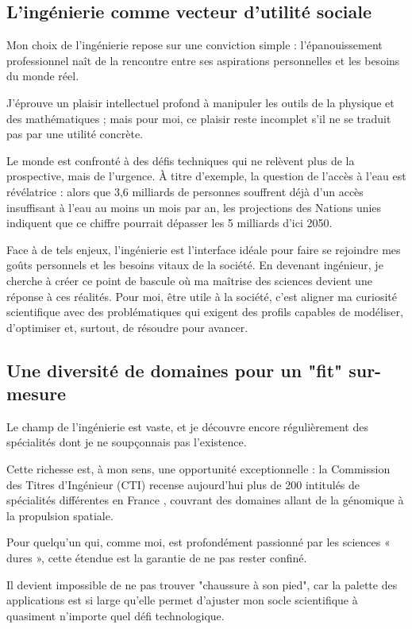 \subsection{L'ingénierie comme vecteur d'utilité sociale}
Mon choix de l'ingénierie repose sur une conviction simple : 
l'épanouissement professionnel naît de la rencontre 
entre ses aspirations personnelles et les besoins du monde réel. 

J’éprouve un plaisir intellectuel profond à manipuler les outils de la physique et des mathématiques ; 
mais pour moi, ce plaisir reste incomplet s'il ne se traduit pas par une utilité concrète.

Le monde est confronté à des défis techniques qui ne relèvent plus de la prospective, 
mais de l'urgence. 
À titre d'exemple, la question de l'accès à l'eau est révélatrice : 
alors que 3,6 milliards de personnes souffrent déjà d'un accès insuffisant à l'eau au moins un mois par an, 
les projections des Nations unies indiquent que ce chiffre pourrait dépasser les 5 milliards d'ici 2050. \cite{onu_eau_2050}

Face à de tels enjeux, 
l'ingénierie est l'interface idéale pour faire se rejoindre mes goûts personnels et les besoins vitaux de la société. 
En devenant ingénieur, je cherche à créer ce point de bascule où ma maîtrise des sciences devient une réponse à ces réalités. 
Pour moi, être utile à la société, 
c’est aligner ma curiosité scientifique avec des problématiques qui exigent des profils capables de modéliser, 
d'optimiser et, surtout, de résoudre pour avancer.

\subsection{Une diversité de domaines pour un "fit" sur-mesure}
Le champ de l'ingénierie est vaste, 
et je découvre encore régulièrement des spécialités dont je ne soupçonnais pas l'existence. 

Cette richesse est, à mon sens, une opportunité exceptionnelle : 
la Commission des Titres d'Ingénieur (CTI) recense aujourd'hui 
plus de 200 intitulés de spécialités différentes en France \cite{cti_donnees}, 
couvrant des domaines allant de la génomique à la propulsion spatiale.

Pour quelqu'un qui, comme moi, est profondément passionné par les sciences « dures », 
cette étendue est la garantie de ne pas rester confiné. 

Il devient impossible de ne pas trouver "chaussure à son pied", 
car la palette des applications est si large 
qu'elle permet d'ajuster mon socle scientifique à quasiment n'importe quel défi technologique.

